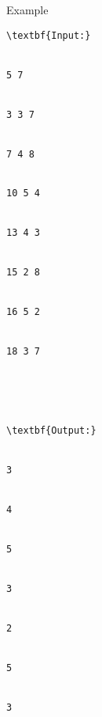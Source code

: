 Example
\begin{verbatim}
\textbf{Input:}


5 7


3 3 7


7 4 8


10 5 4


13 4 3


15 2 8


16 5 2


18 3 7





\textbf{Output:}


3


4


5


3


2


5


3


\end{verbatim}